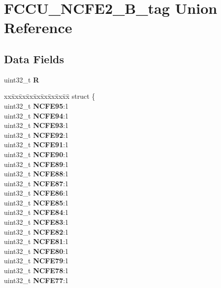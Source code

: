 \hypertarget{unionFCCU__NCFE2__32B__tag}{}\section{F\+C\+C\+U\+\_\+\+N\+C\+F\+E2\+\_\+B\+\_\+tag Union Reference}
\label{unionFCCU__NCFE2__32B__tag}
\subsection*{Data Fields}
\begin{DoxyCompactItemize}
\item 
\mbox{\label{unionFCCU__NCFE2__32B__tag_a91d0b2e315508f25d022a71cbd9d59ee}} 
uint32\+\_\+t {\bfseries R}
\item 
\mbox{\label{unionFCCU__NCFE2__32B__tag_ad5faf7327846092f08fe7c38cbeb5866}} 
\begin{tabbing}
xx\=xx\=xx\=xx\=xx\=xx\=xx\=xx\=xx\=\kill
struct \{\\
\>uint32\_t {\bfseries NCFE95}:1\\
\>uint32\_t {\bfseries NCFE94}:1\\
\>uint32\_t {\bfseries NCFE93}:1\\
\>uint32\_t {\bfseries NCFE92}:1\\
\>uint32\_t {\bfseries NCFE91}:1\\
\>uint32\_t {\bfseries NCFE90}:1\\
\>uint32\_t {\bfseries NCFE89}:1\\
\>uint32\_t {\bfseries NCFE88}:1\\
\>uint32\_t {\bfseries NCFE87}:1\\
\>uint32\_t {\bfseries NCFE86}:1\\
\>uint32\_t {\bfseries NCFE85}:1\\
\>uint32\_t {\bfseries NCFE84}:1\\
\>uint32\_t {\bfseries NCFE83}:1\\
\>uint32\_t {\bfseries NCFE82}:1\\
\>uint32\_t {\bfseries NCFE81}:1\\
\>uint32\_t {\bfseries NCFE80}:1\\
\>uint32\_t {\bfseries NCFE79}:1\\
\>uint32\_t {\bfseries NCFE78}:1\\
\>uint32\_t {\bfseries NCFE77}:1\\

\end{tabbing}
\end{DoxyCompactItemize}
